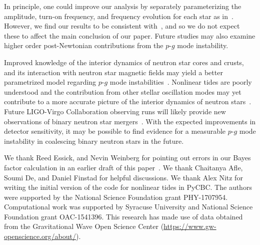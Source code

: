 In principle, one could improve our analysis by separately parameterizing the amplitude, turn-on frequency, and frequency evolution for each star as in~\cite{abbott2019constraining}. However, we find our results to be consistent with~\cite{abbott2019constraining}, and so we do not expect these to affect the main conclusion of our paper. Future studies may also examine higher order post-Newtonian contributions from the $p$-$g$ mode instability.

Improved knowledge of the interior dynamics of neutron star cores and crusts, and its interaction with neutron star magnetic fields may yield a better parametrized model regarding $p$-$g$ mode instabilities~\citep{Weinberg:2015pxa}. Nonlinear tides are poorly understood and the contribution from other stellar oscillation modes may yet contribute to a more accurate picture of the interior dynamics of neutron stars~\citep{Andersson:2017iav}. Future LIGO-Virgo Collaboration observing runs will likely provide new observations of binary neutron star mergers~\citep{Abbott:2016ymx,ligo2018gwtc}. With the expected improvements in detector sensitivity, it may be possible to find evidence for a measurable $p$-$g$ mode instability in coalescing binary neutron stars in the future.


\acknowledgments

We thank Reed Essick, and Nevin Weinberg for pointing out errors in our Bayes factor calculation in an earlier draft of this paper~\citep{Essick:2018wvj}. We  thank Chaitanya Afle, Soumi De, and Daniel Finstad for helpful discussions. We thank Alex Nitz for writing the initial version of the code for nonlinear tides in PyCBC. The authors were supported by the National Science Foundation grant PHY-1707954. Computational work was supported by Syracuse University and National Science Foundation grant OAC-1541396. This research has made use of data obtained from the Gravitational Wave Open Science Center (\url{https://www.gw-openscience.org/about/}).






